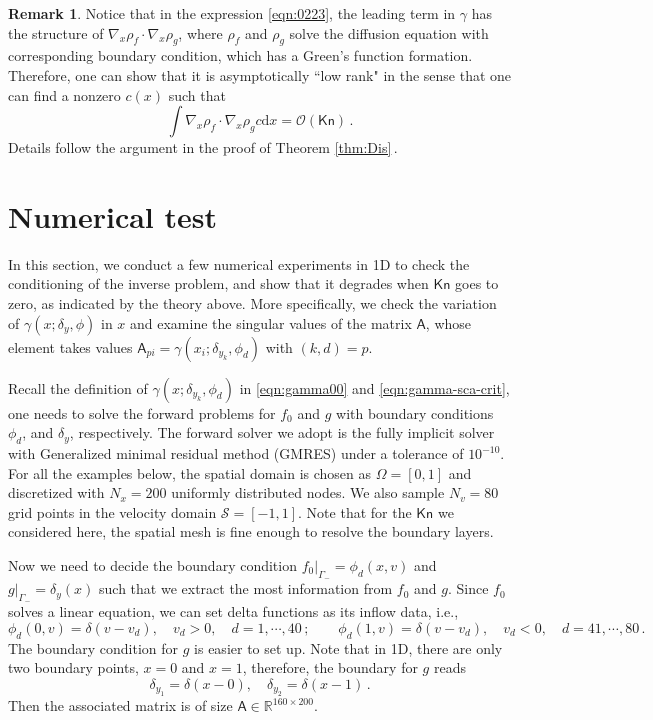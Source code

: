 \documentclass[english,reqno]{amsart}
\theoremstyle{plain}
\theoremstyle{definition} %
\newtheorem{remark}{Remark}
\newcommand{\Amat}{\mathsf{A}}
\newcommand{\rd}{\mathrm{d}}
\newcommand{\Kn}{\mathsf{Kn}}
\begin{document}
\begin{remark}\label{remark:0203}
Notice that in the expression \eqref{eqn:0223}, the leading term in $\gamma$ has the structure of $\nabla_x \rho_f \cdot \nabla_x \rho_g $, where $\rho_f$ and $\rho_g$ solve the diffusion equation with corresponding boundary condition, which has a Green's function formation. Therefore, one can show that it is asymptotically ``low rank" in the sense that one can find a nonzero $c(x)$ such that 
\[
\int \nabla_x \rho_f \cdot \nabla_x \rho_g c \rd{x} = \mathcal{O}(\Kn)\,.
\]
Details follow the argument in the proof of Theorem \ref{thm:Dis}\,.
\end{remark}






\section{Numerical test}
In this section, we conduct a few numerical experiments in 1D to check the conditioning of the inverse problem, and show that it degrades when $\Kn$ goes to zero, as indicated by the theory above. More specifically, we check the variation of $\gamma(x; \delta_y,\phi)$ in $x$ and examine the singular values of the matrix $\Amat$, whose element takes values $\Amat_{pi} = \gamma(x_i; \delta_{y_k},\phi_d)$ with $(k,d)=p$. 

Recall the definition of $\gamma(x; \delta_{y_k},\phi_d)$ in \eqref{eqn:gamma00} and \eqref{eqn:gamma-sca-crit}, one needs to solve the forward problems for $f_0$ and $g$ with boundary conditions $\phi_d$, and $\delta_y$, respectively. The forward solver we adopt is the fully implicit solver \cite{LW17} with Generalized minimal residual method (GMRES) under a tolerance of $10^{-10}$. For all the examples below, the spatial domain is chosen as $\Omega=[0,1]$ and discretized with $N_x=200$ uniformly distributed nodes. We also sample $N_v = 80$ grid points in the velocity domain $\mathcal{S}=[-1,1]$. Note that for the $\Kn$ we considered here, the spatial mesh is fine enough to resolve the boundary layers. 

Now we need to decide the boundary condition $f_0|_{\Gamma_-} = \phi_d(x,v)$ and $g|_{\Gamma_-} = \delta_y(x)$ such that we extract the most information from $f_0$ and $g$. Since $f_0$ solves a linear equation, we can set delta functions as its inflow data, i.e.,
\[
\phi_d(0,v) = \delta(v-v_d), \quad  v_d >0, \quad  d = 1, \cdots, 40\,;  \qquad
\phi_d(1,v) = \delta(v-v_d), \quad  v_d <0, \quad  d = 41, \cdots, 80\,.
\]
The boundary condition for $g$ is easier to set up. Note that in 1D, there are only two boundary points, $x=0$ and $x=1$, therefore, the boundary for $g$ reads
\[
\delta_{y_1} = \delta(x-0), \quad \delta_{y_2} = \delta(x-1)\,.
\]
Then the associated matrix is of size $\Amat\in \mathbb{R}^{160\times 200}$. 
\end{document}
